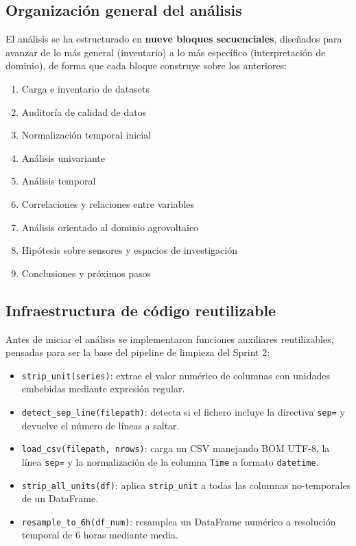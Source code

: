 \documentclass[12pt, a4paper]{article}
\begin{document}
\subsection{Organización general del análisis}

El análisis se ha estructurado en \textbf{nueve bloques secuenciales}, diseñados para avanzar de lo más general (inventario) a lo más específico (interpretación de dominio), de forma que cada bloque construye sobre los anteriores:

\begin{enumerate}[leftmargin=1.5cm]
    \item Carga e inventario de datasets
    \item Auditoría de calidad de datos
    \item Normalización temporal inicial
    \item Análisis univariante
    \item Análisis temporal
    \item Correlaciones y relaciones entre variables
    \item Análisis orientado al dominio agrovoltaico
    \item Hipótesis sobre sensores y espacios de investigación
    \item Conclusiones y próximos pasos
\end{enumerate}

\subsection{Infraestructura de código reutilizable}

Antes de iniciar el análisis se implementaron funciones auxiliares reutilizables, pensadas para ser la base del pipeline de limpieza del Sprint 2:

\begin{itemize}[leftmargin=1.5cm]
    \item \texttt{strip\_unit(series)}: extrae el valor numérico de columnas con unidades embebidas mediante expresión regular.
    \item \texttt{detect\_sep\_line(filepath)}: detecta si el fichero incluye la directiva \texttt{sep=} y devuelve el número de líneas a saltar.
    \item \texttt{load\_csv(filepath, nrows)}: carga un CSV manejando BOM UTF-8, la línea \texttt{sep=} y la normalización de la columna \texttt{Time} a formato \texttt{datetime}.
    \item \texttt{strip\_all\_units(df)}: aplica \texttt{strip\_unit} a todas las columnas no-temporales de un DataFrame.
    \item \texttt{resample\_to\_6h(df\_num)}: resamplea un DataFrame numérico a resolución temporal de 6 horas mediante media.
\end{itemize}
\end{document}
